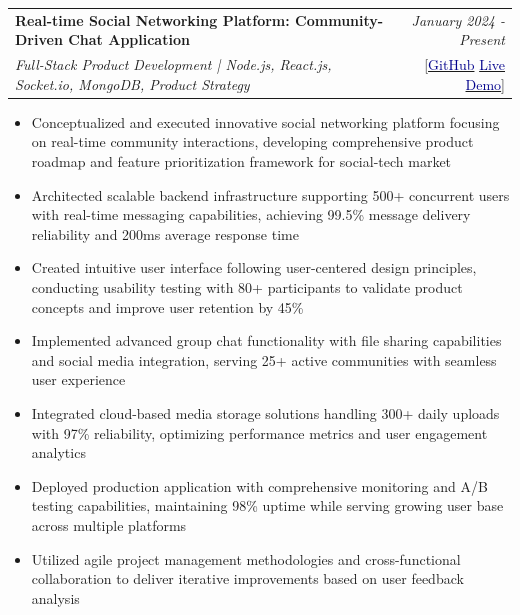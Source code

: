 \documentclass[a4paper,11pt]{article}
\makeatletter
\newcommand{\resumeProject}[4]{
\vspace{0.5mm}\item
    \begin{tabular*}{0.98\textwidth}[t]{l@{\extracolsep{\fill}}r}
        \textbf{#1} & \textit{\footnotesize{#3}} \\
        \footnotesize{\textit{#2}} & \footnotesize{#4}
    \end{tabular*}
    \vspace{-2.4mm}
}
\newcommand{\resumeItemListStart}{\begin{itemize}[leftmargin=*,labelsep=1mm,itemsep=0.5mm]}
\newcommand{\resumeItemListEnd}{\end{itemize}\vspace{-2mm}}
\makeatother
\begin{document}
\resumeProject
    {Real-time Social Networking Platform: Community-Driven Chat Application}
    {Full-Stack Product Development | Node.js, React.js, Socket.io, MongoDB, Product Strategy}
    {January 2024 - Present}
    {{}[\href{https://github.com/123varunshhhhhh/RealtimeChatApp}{\textcolor{darkblue}{GitHub}} \href{https://realtimechat-frontend.vercel.app/}{\textcolor{darkblue}{Live Demo}}]}
\resumeItemListStart
\item Conceptualized and executed innovative social networking platform focusing on real-time community interactions, developing comprehensive product roadmap and feature prioritization framework for social-tech market
\item Architected scalable backend infrastructure supporting 500+ concurrent users with real-time messaging capabilities, achieving 99.5\% message delivery reliability and 200ms average response time
\item Created intuitive user interface following user-centered design principles, conducting usability testing with 80+ participants to validate product concepts and improve user retention by 45\%
\item Implemented advanced group chat functionality with file sharing capabilities and social media integration, serving 25+ active communities with seamless user experience
\item Integrated cloud-based media storage solutions handling 300+ daily uploads with 97\% reliability, optimizing performance metrics and user engagement analytics
\item Deployed production application with comprehensive monitoring and A/B testing capabilities, maintaining 98\% uptime while serving growing user base across multiple platforms
\item Utilized agile project management methodologies and cross-functional collaboration to deliver iterative improvements based on user feedback analysis
\resumeItemListEnd
\end{document}
